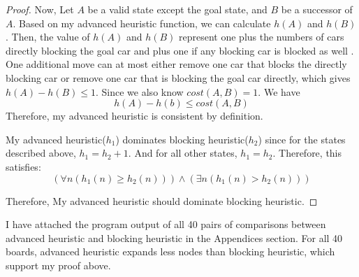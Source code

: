 \documentclass[12pt]{article}
\begin{document}
\begin{enumerate}[(a)]
\begin{proof}
Now, Let $A$ be a valid state except the goal state, and $B$ be a successor of  $A$. Based on my advanced heuristic function, we can calculate $h(A)$ and $h(B)$. Then, the value of $h(A)$ and $h(B)$ represent one plus the numbers of cars directly blocking the goal car and plus one if any blocking car is blocked as well . One additional move can at most either remove one car that blocks the directly blocking car or remove one car that is blocking the goal car directly, which gives $h(A) - h(B) \leq 1$. Since we also know $cost(A,B) = 1$. We have
$$
h(A) - h(b) \leq cost(A, B)
$$
Therefore, my advanced heuristic is consistent by definition.

My advanced heuristic($h_1$) dominates blocking heuristic($h_2$) since for the states described above, $h_1 = h_2 + 1$. And for all other states, $h_1 = h_2$. Therefore, this satisfies:
$$
(\forall n (h_1(n) \geq h_2(n))) \wedge
(\exists n (h_1(n) > h_2(n)))
$$

Therefore, My advanced heuristic should dominate blocking heuristic.
\end{proof}

I have attached the program output of all 40 pairs of comparisons between advanced heuristic and blocking heuristic in the Appendices section. For all 40 boards, advanced heuristic expands less nodes than blocking heuristic, which support my proof above.



\end{enumerate}


\newpage

\end{document}
